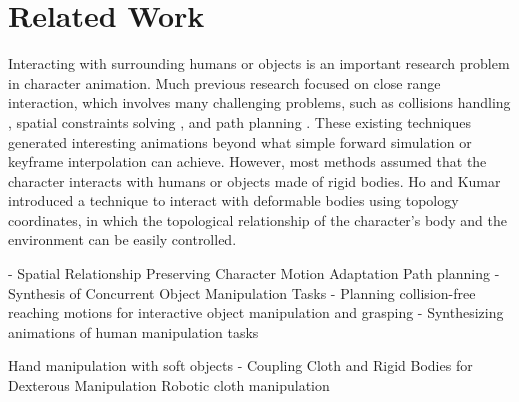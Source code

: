 \section{Related Work}

Interacting with surrounding humans or objects is an important research problem in character animation. Much previous research focused on close range interaction, which involves many challenging problems, such as collisions handling \cite{Ye:2012}, spatial constraints solving \cite{Ho:2010:SRP}, and path planning \cite{Kallman:2003,Yamane:2004:SAH,Bai:2012:SCO}. These existing techniques generated interesting animations beyond what simple forward simulation or keyframe interpolation can achieve. However, most methods assumed that the character interacts with humans or objects made of rigid bodies. Ho and Kumar  introduced a technique to interact with deformable bodies using topology coordinates, in which the topological relationship of the character's body and the environment can be easily controlled.

- Spatial Relationship Preserving Character Motion Adaptation
Path planning
- Synthesis of Concurrent Object Manipulation Tasks
- Planning collision-free reaching motions for interactive object manipulation and grasping
- Synthesizing animations of human manipulation tasks


Hand manipulation with soft objects
- Coupling Cloth and Rigid Bodies for Dexterous Manipulation
 Robotic cloth manipulation

